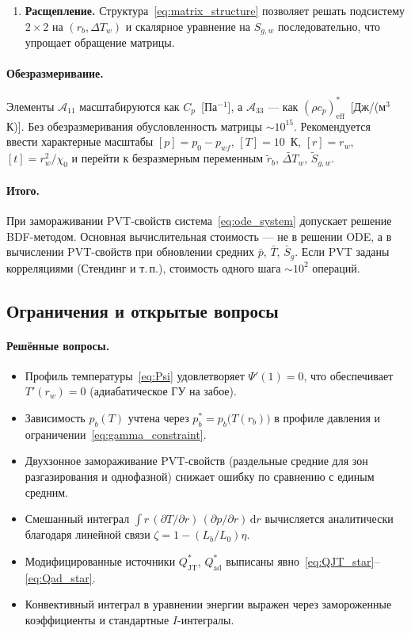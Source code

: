 \documentclass[12pt,a4paper]{article}
\newcommand{\dd}{\mathrm{d}}
\newcommand{\pp}{\partial}
\newcommand{\eff}{\mathrm{eff}}
\begin{document}
\begin{enumerate}[nosep]
  \item \textbf{Расщепление.}
        Структура~\eqref{eq:matrix_structure} позволяет
        решать подсистему $2\times 2$ на $(r_b, \Delta T_w)$
        и скалярное уравнение на $S_{g,w}$ последовательно,
        что упрощает обращение матрицы.
\end{enumerate}

\paragraph{Обезразмеривание.}
Элементы $\mathcal{A}_{11}$ масштабируются как $C_p$~[Па$^{-1}$],
а $\mathcal{A}_{33}$ --- как $(\rho c_p)_\eff^*$~[Дж/(м$^3$\,К)].
Без обезразмеривания обусловленность матрицы $\sim 10^{15}$.
Рекомендуется ввести характерные масштабы
$[p] = p_0 - p_{wf}$, $[T] = 10$~К, $[r] = r_w$, $[t] = r_w^2/\chi_0$
и перейти к безразмерным переменным $\tilde{r}_b$,
$\tilde{\Delta T}_w$, $\tilde{S}_{g,w}$.

\paragraph{Итого.}
При замораживании PVT-свойств система~\eqref{eq:ode_system}
допускает решение BDF-методом.
Основная вычислительная стоимость --- не в решении ODE,
а в вычислении PVT-свойств при обновлении средних $\bar{p}$,
$\bar{T}$, $\bar{S}_g$. Если PVT заданы корреляциями (Стендинг
и т.\,п.), стоимость одного шага $\sim 10^2$ операций.


\subsection{Ограничения и открытые вопросы}

\paragraph{Решённые вопросы.}
\begin{itemize}[nosep]
  \item Профиль температуры~\eqref{eq:Psi} удовлетворяет
        $\Psi'(1) = 0$, что обеспечивает $T'(r_w) = 0$
        (адиабатическое ГУ на забое).
  \item Зависимость $p_b(T)$ учтена через
        $p_b^* = p_b\bigl(T(r_b)\bigr)$
        в профиле давления и ограничении~\eqref{eq:gamma_constraint}.
  \item Двухзонное замораживание PVT-свойств
        (раздельные средние для зон разгазирования и однофазной)
        снижает ошибку по сравнению с единым средним.
  \item Смешанный интеграл $\int r\,(\pp T/\pp r)\,(\pp p/\pp r)\,\dd r$
        вычисляется аналитически благодаря линейной связи
        $\zeta = 1 - (L_b/L_0)\eta$.
  \item Модифицированные источники $Q_\mathrm{JT}^*$,
        $Q_\mathrm{ad}^*$ выписаны
        явно~\eqref{eq:QJT_star}--\eqref{eq:Qad_star}.
  \item Конвективный интеграл в уравнении энергии
        выражен через замороженные коэффициенты
        и стандартные $I$-интегралы.
\end{itemize}
\end{document}
